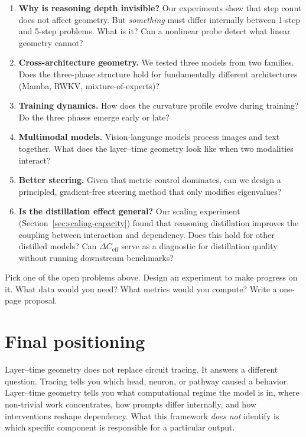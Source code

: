 \documentclass[11pt, twoside, openright]{memoir}
\begin{document}
\begin{enumerate}
\item \textbf{Why is reasoning depth invisible?} Our experiments show
  that step count does not affect geometry. But \emph{something} must
  differ internally between 1-step and 5-step problems. What is it?
  Can a nonlinear probe detect what linear geometry cannot?

\item \textbf{Cross-architecture geometry.} We tested three models from
  two families. Does the three-phase structure hold for fundamentally
  different architectures (Mamba, RWKV, mixture-of-experts)?

\item \textbf{Training dynamics.} How does the curvature profile evolve
  during training? Do the three phases emerge early or late?

\item \textbf{Multimodal models.} Vision-language models process images
  and text together. What does the layer--time geometry look like when
  two modalities interact?

\item \textbf{Better steering.} Given that metric control dominates,
  can we design a principled, gradient-free steering method that only
  modifies eigenvalues?

\item \textbf{Is the distillation effect general?} Our scaling experiment
  (Section~\ref{sec:scaling-capacity}) found that reasoning distillation
  improves the coupling between interaction and dependency. Does this hold
  for other distilled models? Can $\Delta C_{\mathrm{eff}}$ serve as a
  diagnostic for distillation quality without running downstream benchmarks?
\end{enumerate}

\begin{tryit}
Pick one of the open problems above. Design an experiment to make
progress on it. What data would you need? What metrics would you
compute? Write a one-page proposal.
\end{tryit}

\section{Final positioning}

Layer--time geometry does not replace circuit tracing. It answers a different
question. Tracing tells you which head, neuron, or pathway caused a
behavior. Layer--time geometry tells you what computational regime the model
is in, where non-trivial work concentrates, how prompts differ internally,
and how interventions reshape dependency. What this framework \emph{does not}
identify is which specific component is responsible for a particular output.
\end{document}
